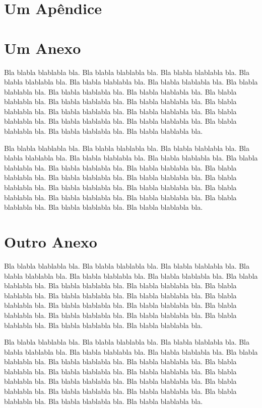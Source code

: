 \documentclass[diss,capa]{texufpel}
\begin{document}

 

\apendices
\chapter{Um Apêndice}

\anexos
\chapter{Um Anexo}

Bla blabla blablabla bla.  Bla blabla blablabla bla.  Bla blabla
blablabla bla.  Bla blabla blablabla bla.  Bla blabla blablabla bla.
Bla blabla blablabla bla.  Bla blabla blablabla bla.  Bla blabla
blablabla bla.  Bla blabla blablabla bla.  Bla blabla blablabla bla.
Bla blabla blablabla bla.  Bla blabla blablabla bla.  Bla blabla
blablabla bla.  Bla blabla blablabla bla.  Bla blabla blablabla bla.
Bla blabla blablabla bla.  Bla blabla blablabla bla.  Bla blabla
blablabla bla.  Bla blabla blablabla bla.  Bla blabla blablabla bla.
Bla blabla blablabla bla.

Bla blabla blablabla bla.  Bla blabla blablabla bla.  Bla blabla
blablabla bla.  Bla blabla blablabla bla.  Bla blabla blablabla bla.
Bla blabla blablabla bla.  Bla blabla blablabla bla.  Bla blabla
blablabla bla.  Bla blabla blablabla bla.  Bla blabla blablabla bla.
Bla blabla blablabla bla.  Bla blabla blablabla bla.  Bla blabla
blablabla bla.  Bla blabla blablabla bla.  Bla blabla blablabla bla.
Bla blabla blablabla bla.  Bla blabla blablabla bla.  Bla blabla
blablabla bla.  Bla blabla blablabla bla.  Bla blabla blablabla bla.
Bla blabla blablabla bla.

\chapter{Outro Anexo}

Bla blabla blablabla bla.  Bla blabla blablabla bla.  Bla blabla
blablabla bla.  Bla blabla blablabla bla.  Bla blabla blablabla bla.
Bla blabla blablabla bla.  Bla blabla blablabla bla.  Bla blabla
blablabla bla.  Bla blabla blablabla bla.  Bla blabla blablabla bla.
Bla blabla blablabla bla.  Bla blabla blablabla bla.  Bla blabla
blablabla bla.  Bla blabla blablabla bla.  Bla blabla blablabla bla.
Bla blabla blablabla bla.  Bla blabla blablabla bla.  Bla blabla
blablabla bla.  Bla blabla blablabla bla.  Bla blabla blablabla bla.
Bla blabla blablabla bla.

Bla blabla blablabla bla.  Bla blabla blablabla bla.  Bla blabla
blablabla bla.  Bla blabla blablabla bla.  Bla blabla blablabla bla.
Bla blabla blablabla bla.  Bla blabla blablabla bla.  Bla blabla
blablabla bla.  Bla blabla blablabla bla.  Bla blabla blablabla bla.
Bla blabla blablabla bla.  Bla blabla blablabla bla.  Bla blabla
blablabla bla.  Bla blabla blablabla bla.  Bla blabla blablabla bla.
Bla blabla blablabla bla.  Bla blabla blablabla bla.  Bla blabla
blablabla bla.  Bla blabla blablabla bla.  Bla blabla blablabla bla.
Bla blabla blablabla bla.

\end{document}
